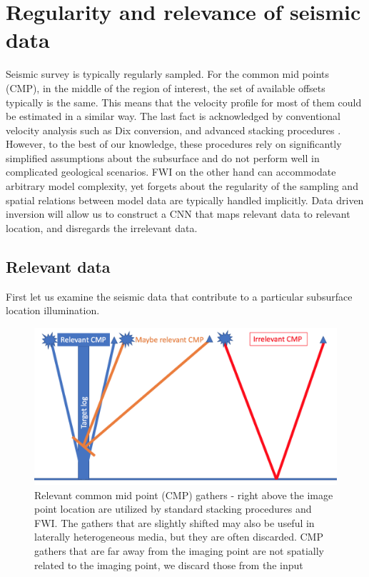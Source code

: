 \documentclass[paper,twocolomn]{geophysics}
\begin{document}
\section{Regularity and relevance of seismic data}
Seismic survey is typically regularly sampled. 
For the common mid points (CMP), in the middle of the region of interest, the set of available offsets typically is the same.
This means that the velocity profile for most of them could be estimated in a similar way.
The last fact is acknowledged by conventional velocity analysis such as Dix conversion, and advanced stacking procedures \citep{mann1999common}. However, to the best of our knowledge, these procedures rely on significantly simplified assumptions about the subsurface and do not perform well in complicated geological scenarios.
FWI on the other hand can accommodate arbitrary model complexity, yet forgets about the regularity of the sampling and spatial relations between model data are typically handled implicitly. Data driven inversion will allow us to construct a CNN that maps relevant data to relevant location, and disregards the irrelevant data.  

\subsection{Relevant data}

First let us examine the seismic data that contribute to a particular subsurface location illumination.

\begin{figure}[h!]
	\centering
	\includegraphics[width=0.7\linewidth]{Fig/relevantCMP}
	\caption{Relevant common mid point (CMP) gathers - right above the image point location are utilized by standard stacking procedures and FWI. The gathers that are slightly shifted may also be useful in laterally heterogeneous media, but they are often discarded. CMP gathers that are far away from the imaging point are not spatially related to the imaging point, we discard those from the input}
	\label{fig:relevantCMP}
\end{figure}
\end{document}
